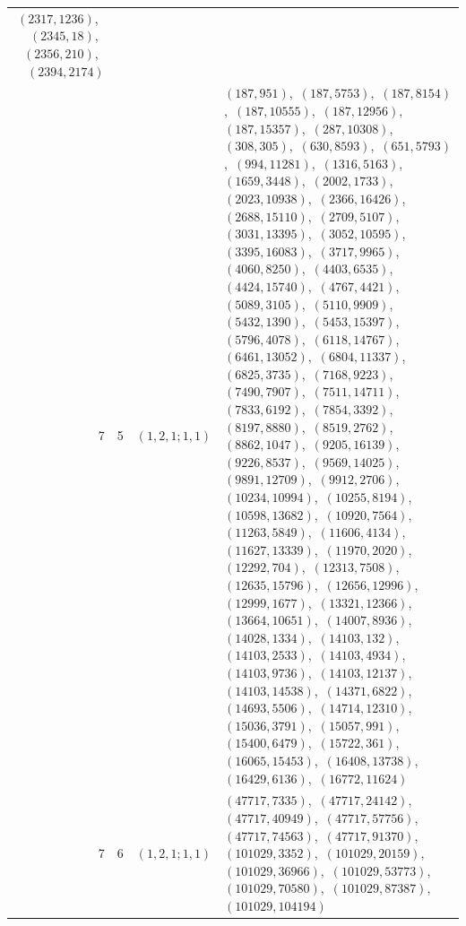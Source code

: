 \documentclass[11pt]{article}
\begin{document}
\begin{longtable}{@{}rrl>{\raggedright\arraybackslash}p{}@{}}
$(2317,1236)$,\allowbreak\ $(2345,18)$,\allowbreak\ $(2356,210)$,\allowbreak\ $(2394,2174)$\\
7 & 5 & $(1,2,1;1,1)$ & $(187,951)$,\allowbreak\ $(187,5753)$,\allowbreak\ $(187,8154)$,\allowbreak\ $(187,10555)$,\allowbreak\ $(187,12956)$,\allowbreak\ $(187,15357)$,\allowbreak\ $(287,10308)$,\allowbreak\ $(308,305)$,\allowbreak\ $(630,8593)$,\allowbreak\ $(651,5793)$,\allowbreak\ $(994,11281)$,\allowbreak\ $(1316,5163)$,\allowbreak\ $(1659,3448)$,\allowbreak\ $(2002,1733)$,\allowbreak\ $(2023,10938)$,\allowbreak\ $(2366,16426)$,\allowbreak\ $(2688,15110)$,\allowbreak\ $(2709,5107)$,\allowbreak\ $(3031,13395)$,\allowbreak\ $(3052,10595)$,\allowbreak\ $(3395,16083)$,\allowbreak\ $(3717,9965)$,\allowbreak\ $(4060,8250)$,\allowbreak\ $(4403,6535)$,\allowbreak\ $(4424,15740)$,\allowbreak\ $(4767,4421)$,\allowbreak\ $(5089,3105)$,\allowbreak\ $(5110,9909)$,\allowbreak\ $(5432,1390)$,\allowbreak\ $(5453,15397)$,\allowbreak\ $(5796,4078)$,\allowbreak\ $(6118,14767)$,\allowbreak\ $(6461,13052)$,\allowbreak\ $(6804,11337)$,\allowbreak\ $(6825,3735)$,\allowbreak\ $(7168,9223)$,\allowbreak\ $(7490,7907)$,\allowbreak\ $(7511,14711)$,\allowbreak\ $(7833,6192)$,\allowbreak\ $(7854,3392)$,\allowbreak\ $(8197,8880)$,\allowbreak\ $(8519,2762)$,\allowbreak\ $(8862,1047)$,\allowbreak\ $(9205,16139)$,\allowbreak\ $(9226,8537)$,\allowbreak\ $(9569,14025)$,\allowbreak\ $(9891,12709)$,\allowbreak\ $(9912,2706)$,\allowbreak\ $(10234,10994)$,\allowbreak\ $(10255,8194)$,\allowbreak\ $(10598,13682)$,\allowbreak\ $(10920,7564)$,\allowbreak\ $(11263,5849)$,\allowbreak\ $(11606,4134)$,\allowbreak\ $(11627,13339)$,\allowbreak\ $(11970,2020)$,\allowbreak\ $(12292,704)$,\allowbreak\ $(12313,7508)$,\allowbreak\ $(12635,15796)$,\allowbreak\ $(12656,12996)$,\allowbreak\ $(12999,1677)$,\allowbreak\ $(13321,12366)$,\allowbreak\ $(13664,10651)$,\allowbreak\ $(14007,8936)$,\allowbreak\ $(14028,1334)$,\allowbreak\ $(14103,132)$,\allowbreak\ $(14103,2533)$,\allowbreak\ $(14103,4934)$,\allowbreak\ $(14103,9736)$,\allowbreak\ $(14103,12137)$,\allowbreak\ $(14103,14538)$,\allowbreak\ $(14371,6822)$,\allowbreak\ $(14693,5506)$,\allowbreak\ $(14714,12310)$,\allowbreak\ $(15036,3791)$,\allowbreak\ $(15057,991)$,\allowbreak\ $(15400,6479)$,\allowbreak\ $(15722,361)$,\allowbreak\ $(16065,15453)$,\allowbreak\ $(16408,13738)$,\allowbreak\ $(16429,6136)$,\allowbreak\ $(16772,11624)$\\
7 & 6 & $(1,2,1;1,1)$ & $(47717,7335)$,\allowbreak\ $(47717,24142)$,\allowbreak\ $(47717,40949)$,\allowbreak\ $(47717,57756)$,\allowbreak\ $(47717,74563)$,\allowbreak\ $(47717,91370)$,\allowbreak\ $(101029,3352)$,\allowbreak\ $(101029,20159)$,\allowbreak\ $(101029,36966)$,\allowbreak\ $(101029,53773)$,\allowbreak\ $(101029,70580)$,\allowbreak\ $(101029,87387)$,\allowbreak\ $(101029,104194)$\\

\end{longtable}
\end{document}
